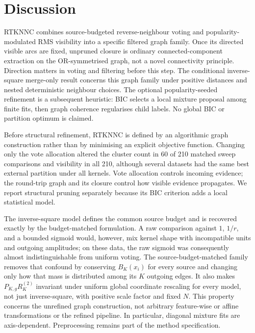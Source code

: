 \documentclass[pdflatex,sn-basic,Numbered]{sn-jnl}
\begin{document}
\section{Discussion}\label{sec:discussion}

RTKNNC combines source-budgeted reverse-neighbour voting and
popularity-modulated RMS visibility into a specific filtered graph family.
Once its directed visible arcs are fixed, unpruned closure is ordinary
connected-component extraction on the OR-symmetrised graph, not a novel
connectivity principle. Direction matters in voting and filtering before this
step. The conditional inverse-square merge-only result concerns this graph
family under positive distances and nested deterministic neighbour choices.
The optional popularity-seeded refinement is a subsequent heuristic: BIC
selects a local mixture proposal among finite fits, then graph coherence
regularises child labels. No global BIC or partition optimum is claimed.

Before structural refinement, RTKNNC is defined by an algorithmic graph construction rather than by
minimising an explicit objective function. Changing only the vote allocation
altered the cluster count in 60 of 210 matched sweep comparisons and visibility in
all 210, although several datasets had the same best external partition under
all kernels. Vote allocation controls incoming evidence; the round-trip graph
and its closure control how visible evidence propagates. We report structural
pruning separately because its BIC criterion adds a local statistical model.

The inverse-square model defines the common source budget and is recovered
exactly by the budget-matched formulation.  A raw comparison against $1$,
$1/r$, and a bounded sigmoid would, however, mix kernel shape with incompatible
units and outgoing amplitudes; on these data, the raw sigmoid was consequently
almost indistinguishable from uniform voting.  The source-budget-matched family
removes that confound by conserving $B_K(x_i)$ for every source and changing
only how that mass is distributed among its $K$ outgoing edges.  It also makes
$P_{K,g}R_K^{(2)}$ invariant under uniform global coordinate rescaling for every model,
not just inverse-square, with positive scale factor and fixed $N$. This property
concerns the unrefined graph construction, not arbitrary feature-wise or affine
transformations or the refined pipeline. In particular, diagonal mixture fits
are axis-dependent. Preprocessing remains part of the method specification.
\end{document}

